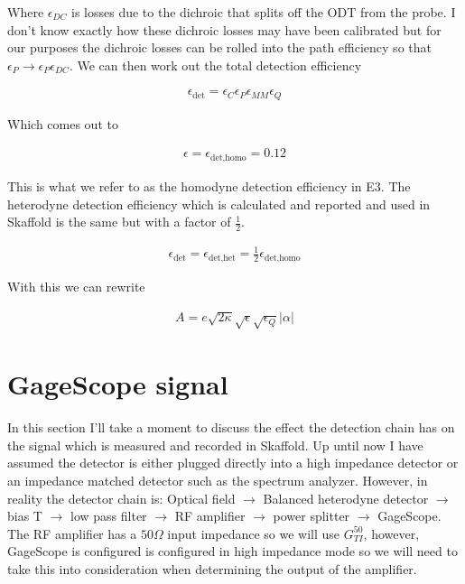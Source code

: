 \documentclass[12pt]{article}
\begin{document}
Where $\epsilon_{DC}$ is losses due to the dichroic that splits off the ODT from the probe. I don't know exactly how these dichroic losses may have been calibrated but for our purposes the dichroic losses can be rolled into the path efficiency so that $\epsilon_P \rightarrow \epsilon_P \epsilon_{DC}$. We can then work out the total detection efficiency

\begin{align}
\epsilon_{\text{det}} = \epsilon_C \epsilon_P \epsilon_{MM} \epsilon_Q
\end{align}

Which comes out to

\begin{align}
\epsilon = \epsilon_{\text{det,homo}} = 0.12
\end{align}

This is what we refer to as the homodyne detection efficiency in E3. The heterodyne detection efficiency which is calculated and reported and used in Skaffold is the same but with a factor of $\frac{1}{2}$.

\begin{align}
\epsilon_{\text{det}} = \epsilon_{\text{det,het}} = \frac{1}{2} \epsilon_{\text{det,homo}}
\end{align}

With this we can rewrite

\begin{align}
A = e \sqrt{2\kappa} \sqrt{\epsilon} \sqrt{\epsilon_Q} \lvert \alpha \rvert
\end{align}

\section{GageScope signal}

In this section I'll take a moment to discuss the effect the detection chain has on the signal which is measured and recorded in Skaffold. Up until now I have assumed the detector is either plugged directly into a high impedance detector or an impedance matched detector such as the spectrum analyzer. However, in reality the detector chain is: Optical field $\rightarrow$ Balanced heterodyne detector $\rightarrow$ bias T $\rightarrow$ low pass filter $\rightarrow$ RF amplifier $\rightarrow$ power splitter $\rightarrow$ GageScope. The RF amplifier has a $50 \Omega$ input impedance so we will use $G_{TI}^{50}$, however, GageScope is configured is configured in high impedance mode so we will need to take this into consideration when determining the output of the amplifier.
\end{document}
